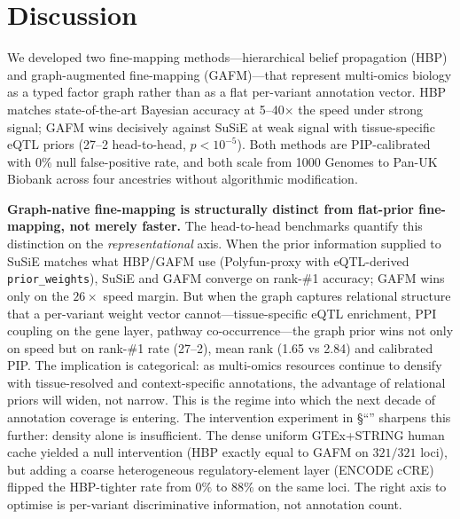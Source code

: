 \section*{Discussion}

We developed two fine-mapping methods---hierarchical belief
propagation (HBP) and graph-augmented
fine-mapping (GAFM)---that represent multi-omics biology as a typed factor
graph rather than as a flat per-variant annotation vector. HBP
matches state-of-the-art Bayesian accuracy at 5--40$\times$ the
speed under strong signal; GAFM wins decisively against SuSiE at
weak signal with tissue-specific eQTL priors (27--2 head-to-head,
$p < 10^{-5}$). Both methods are PIP-calibrated with 0\% null
false-positive rate, and both scale from 1000 Genomes to Pan-UK
Biobank across four ancestries without algorithmic modification.

\textbf{Graph-native fine-mapping is structurally distinct from
flat-prior fine-mapping, not merely faster.} The head-to-head
benchmarks quantify this distinction on the
\emph{representational} axis. When the prior information supplied
to SuSiE matches what HBP/GAFM use (Polyfun-proxy with eQTL-derived
\texttt{prior\_weights}), SuSiE and GAFM converge on rank-\#1
accuracy; GAFM wins only on the $26 \times$ speed margin.  But when
the graph captures relational structure that a per-variant weight
vector cannot---tissue-specific eQTL enrichment, PPI coupling on
the gene layer, pathway co-occurrence---the graph prior wins not
only on speed but on rank-\#1 rate (27--2), mean rank (1.65 vs
2.84) and calibrated PIP. The implication is categorical: as
multi-omics resources continue to densify with tissue-resolved
and context-specific annotations, the advantage of relational
priors will widen, not narrow. This is the regime into which the
next decade of annotation coverage is entering. The
intervention experiment in
\S``'' sharpens this further: density alone is
insufficient. The dense uniform GTEx+STRING human cache yielded a
null intervention (HBP exactly equal to GAFM on $321/321$ loci), but
adding a coarse heterogeneous regulatory-element layer
(ENCODE cCRE) flipped the HBP-tighter rate from $0\%$ to $88\%$
on the same loci. The right axis to optimise is per-variant
discriminative information, not annotation count.

